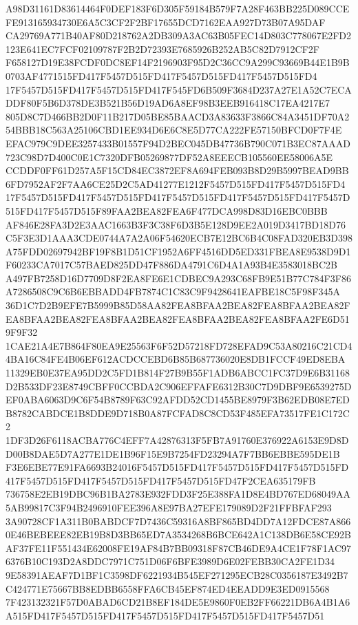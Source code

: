 \documentclass[UTF8,fontset=fandol,zihao=-4,a4paper]{ctexart}
\begin{document}
{{A98D31161D83614464F0DEF183F6D305F59184B579F7A28F463BB225D089CCEFE913165934730E6A5C3CF2F2BF17655DCD7162EAA927D73B07A95DAF
CA29769A771B40AF80D218762A2DB309A3AC63B05FEC14D803C778067E2FD2123E641EC7FCF02109787F2B2D72393E7685926B252AB5C82D7912CF2F
F658127D19E38FCDF0DC8EF14F2196903F95D2C36CC9A299C93669B44E1B9B0703AF4771515FD417F5457D515FD417F5457D515FD417F5457D515FD4
17F5457D515FD417F5457D515FD417F545FD6B509F3684D237A27E1A52C7ECADDF80F5B6D378DE3B521B56D19AD6A8EF98B3EEB916418C17EA4217E7
805D8C7D466BB2D0F11B217D05BE85BAACD3A83633F3866C84A3451DF70A254BBB18C563A25106CBD1EE934D6E6C8E5D77CA222FE57150BFCD0F7F4E
EFAC979C9DEE3257433B01557F94D2BEC045DB47736B790C071B3EC87AAAD723C98D7D400C0E1C7320DFB05269877DF52A8EEECB105560EE58006A5E
CCDDF0FF61D257A5F15CD84EC3872EF8A694FEB093B8D29B5997BEAD9BB6FD7952AF2F7AA6CE25D2C5AD41277E1212F5457D515FD417F5457D515FD4
17F5457D515FD417F5457D515FD417F5457D515FD417F5457D515FD417F5457D515FD417F5457D515F89FAA2BEA82FEA6F477DCA998D83D16EBC0BBB
AF846E28FA3D2E3AAC1663B3F3C38F6D3B5E128D9EE2A019D3417BD18D76C5F3E3D1AAA3CDE0744A7A2A06F54620ECB7E12BC6B4C08FAD320EB3D398
A75FDD02697942BF19F8B1D51CF1952A6FF4516DD5ED331FBEA8E9538D9D1F60233CA7017C57BAED825DD47F886DA4791C6D4A1A93B4E3583018BC2B
A497FB7258D16D7709D8F2EA8FE6E1CDBEC9A293C68FB9E51B77C784F3F86A7286508C9C6B6EBBADD4FB7874C1C83C9F9428641EAFBE18C5F98F345A
36D1C7D2B9EFE7B5999B85D58AA82FEA8BFAA2BEA82FEA8BFAA2BEA82FEA8BFAA2BEA82FEA8BFAA2BEA82FEA8BFAA2BEA82FEA8BFAA2FE6D519F9F32
1CAE21A4E7B864F80EA9E25563F6F52D57218FD728EFAD9C53A80216C21CD44BA16C84FE4B06EF612ACDCCEBD6B85B687736020E8DB1FCCF49ED8EBA
11329EB0E37EA95DD2C5FD1B814F27B9B55F1ADB6ABCC1FC37D9E6B31168D2B533DF23E8749CBFF0CCBDA2C906EFFAFE6312B30C7D9DBF9E6539275D
EF0ABA6063D9C6F54B8789F63C92AFDD52CD1455BE8979F3B62EDB08E7EDB8782CABDCE1B8DDE9D718B0A87FCFAD8C8CD53F485EFA73517FE1C172C2
1DF3D26F6118ACBA776C4EFF7A42876313F5FB7A91760E376922A6153E9D8DD00B8DAE5D7A277E1DE1B96F15E9B7254FD23294A7F7BB6EBBE595DE1B
F3E6EBE77E91FA6693B24016F5457D515FD417F5457D515FD417F5457D515FD417F5457D515FD417F5457D515FD417F5457D515FD47F2CEA635179FB
736758E2EB19DBC96B1BA2783E932FDD3F25E388FA1D8E4BD767ED68049AA5AB99817C3F94B2496910FEE396A8E97BA27EFE179089D2F21FFBFAF293
3A90728CF1A311B0BABDCF7D7436C59316A8BF865BD4DD7A12FDCE87A8660E46BEBEEE82EB19B8D3BB65ED7A3534268B6BCE642A1C138DB6E58CE92B
AF37FE11F551434E62008FE19AF84B7BB09318F87CB46DE9A4CE1F78F1AC976376B10C193D2A8DDC7971C751D06F6BFE3989D6E02FEBB30CA2FE1D34
9E58391AEAF7D1BF1C3598DF6221934B545EF271295ECB28C0356187E3492B7C424771E75667BB8EDBB6558FFA6CB45EF874ED4EEADD9E3ED0915568
7F423132321F57D0ABAD6CD21B8EF184DE5E9860F0EB2FF66221DB6A4B1A6A515FD417F5457D515FD417F5457D515FD417F5457D515FD417F5457D51
}}
\end{document}
